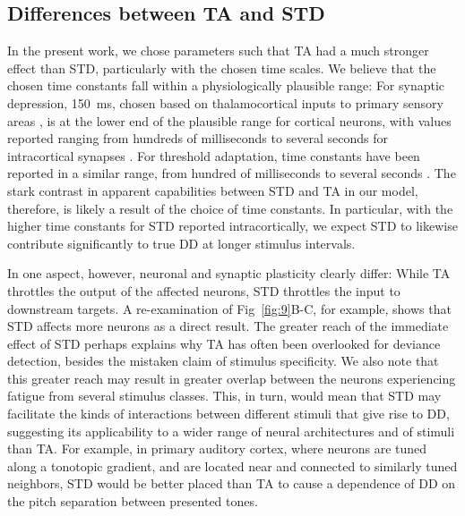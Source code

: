 \documentclass[10pt,letterpaper]{article}
\newcommand{\FIG}[1]{Fig~\ref{fig:#1}}
\begin{document}
\subsection*{Differences between TA and STD}

In the present work, we chose parameters such that TA had a much stronger effect than STD, particularly with the chosen time scales. We believe that the chosen time constants fall within a physiologically plausible range: For synaptic depression, \qty{150}{\milli\second}, chosen based on thalamocortical inputs to primary sensory areas \cite{David2013-cw,Pennington2020-ua}, is at the lower end of the plausible range for cortical neurons, with values reported ranging from hundreds of milliseconds to several seconds for intracortical synapses \cite{Tsodyks1997-qt,Markram1998-et,Varela1997-nr, Asari2009-vu,Levy2011-af}. For threshold adaptation, time constants have been reported in a similar range, from hundred of milliseconds \cite{Henze2001-xd, La_Camera2006-dz, Abolafia2011-ig, Pozzorini2015-ei} to several seconds \cite{Schwindt1989-lv, Fleidervish1996-ly, Sanchez-Vives2000-rv, La_Camera2006-dz}. The stark contrast in apparent capabilities between STD and TA in our model, therefore, is likely a result of the choice of time constants. In particular, with the higher time constants for STD reported intracortically, we expect STD to likewise contribute significantly to true DD at longer stimulus intervals.

In one aspect, however, neuronal and synaptic plasticity clearly differ: While TA throttles the output of the affected neurons, STD throttles the input to downstream targets. A re-examination of \FIG{9}B-C, for example, shows that STD affects more neurons as a direct result. The greater reach of the immediate effect of STD perhaps explains why TA has often been overlooked for deviance detection, besides the mistaken claim of stimulus specificity. We also note that this greater reach may result in greater overlap between the neurons experiencing fatigue from several stimulus classes. This, in turn, would mean that STD may facilitate the kinds of interactions between different stimuli that give rise to DD, suggesting its applicability to a wider range of neural architectures and of stimuli than TA. For example, in primary auditory cortex, where neurons are tuned along a tonotopic gradient, and are located near and connected to similarly tuned neighbors, STD would be better placed than TA to cause a dependence of DD on the pitch separation between presented tones.
\end{document}
